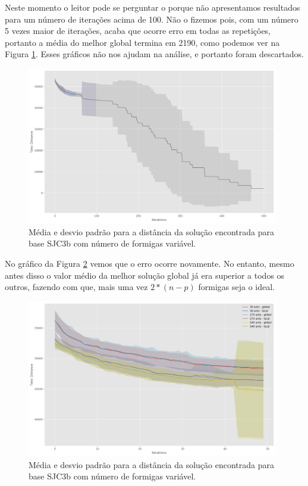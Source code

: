 Neste momento o leitor pode se perguntar o porque não apresentamos resultados para um número de iterações acima de 100. Não o fizemos pois, com um número 5 vezes maior de iterações, acaba que ocorre erro em todas as repetições, portanto a média do melhor global termina em 2190, como podemos ver na Figura \ref{fig:sjc3b_fail}. Esses gráficos não nos ajudam na análise, e portanto foram descartados.

\begin{figure}[h]	
  \centering
  \includegraphics[width=11cm,keepaspectratio]{images/SJC3b_iterations_fail.png}
  \caption{Média e desvio padrão para a distância da solução encontrada para base SJC3b com número de formigas variável.}
  \label{fig:sjc3b_fail}
\end{figure}

No gráfico da Figura \ref{fig:sjc3b_ants} vemos que o erro ocorre novamente. No entanto, mesmo antes disso o valor médio da melhor solução global já era superior a todos os outros, fazendo com que, mais uma vez $2 * (n - p)$ formigas seja o ideal.

\begin{figure}[h]	
  \centering
  \includegraphics[width=11cm,keepaspectratio]{images/SJC3b_ants.png}
  \caption{Média e desvio padrão para a distância da solução encontrada para base SJC3b com número de formigas variável.}
  \label{fig:sjc3b_ants}
\end{figure}

